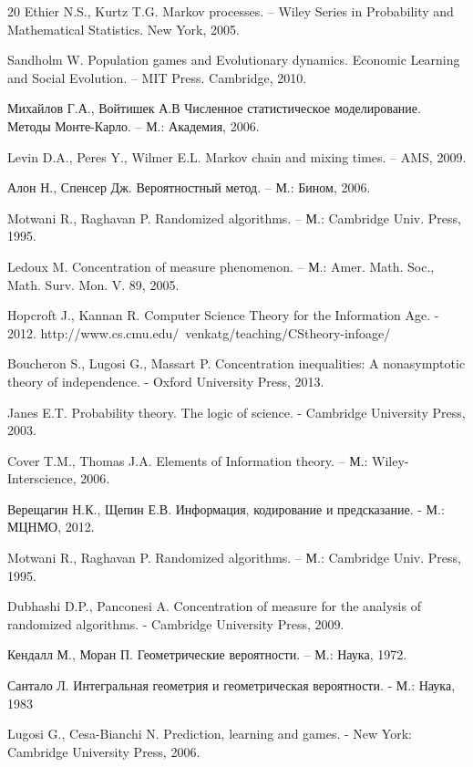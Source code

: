 \begin{thebibliography} {20}
Ethier N.S., Kurtz T.G. Markov processes. -- Wiley Series in Probability and Mathematical Statistics. New York, 2005.

Sandholm W. Population games and Evolutionary dynamics. Economic Learning and Social Evolution. -- MIT Press. Cambridge, 2010.

Михайлов Г.А., Войтишек А.В Численное статистическое моделирование. Методы Монте-Карло. – М.: Академия, 2006.

Levin D.A., Peres Y., Wilmer E.L. Markov chain and mixing times. -- AMS, 2009.

Алон Н., Спенсер Дж. Вероятностный метод. – М.: Бином, 2006.




Motwani R., Raghavan P. Randomized algorithms. – М.: Cambridge Univ. Press, 1995.

Ledoux M. Concentration of measure phenomenon. – М.: Amer. Math. Soc.,  Math. Surv. Mon. V. 89, 2005. 

Hopcroft J., Kannan R. Computer Science Theory for the Information Age. - 2012.
{\small http://www.cs.cmu.edu/~venkatg/teaching/CStheory-infoage/}

\label{BLM}
Boucheron S., Lugosi G., Massart P. Concentration inequalities: A nonasymptotic theory of independence. - Oxford University Press, 2013.

Janes E.T. Probability theory. The logic of science. - Cambridge University Press, 2003.

Cover T.M., Thomas J.A. Elements of Information theory. – М.:  Wiley-Interscience, 2006.

Верещагин Н.К., Щепин Е.В. Информация, кодирование и предсказание. - М.: МЦНМО, 2012.

Motwani R., Raghavan P. Randomized algorithms. – М.: Cambridge Univ. Press, 1995.

Dubhashi D.P., Panconesi A. Concentration of measure for the analysis of randomized algorithms. - Cambridge University Press, 2009.

Кендалл М., Моран П. Геометрические вероятности. – М.: Наука, 1972.

Сантало Л. Интегральная геометрия и геометрическая вероятности. - М.: Наука, 1983


\label{LC}
Lugosi G., Cesa-Bianchi N. Prediction, learning and games. - New York: Cambridge University Press, 2006.


\end{thebibliography}
